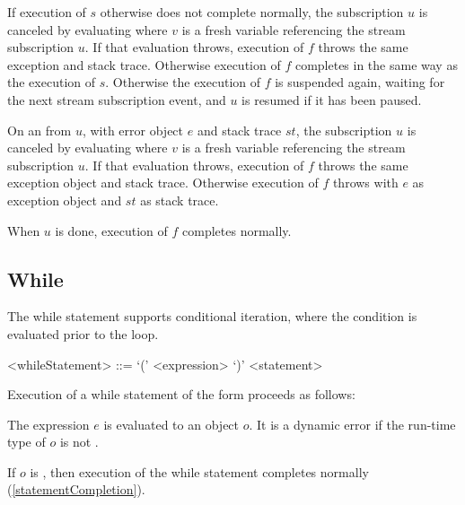 \documentclass[makeidx]{article}
\begin{document}
{\LMHash{}%
If execution of $s$ otherwise does not complete normally,
the subscription $u$ is canceled by evaluating 
where $v$ is a fresh variable referencing the stream subscription $u$.
If that evaluation throws,
execution of $f$ throws the same exception and stack trace.
Otherwise execution of $f$ completes in the same way as the execution of $s$.
Otherwise the execution of $f$ is suspended again, waiting for
the next stream subscription event,
and $u$ is resumed if it has been paused.

\LMHash{}%
On an  from $u$,
with error object $e$ and stack trace $st$,
the subscription $u$ is canceled by evaluating 
where $v$ is a fresh variable referencing the stream subscription $u$.
If that evaluation throws,
execution of $f$ throws the same exception object and stack trace.
Otherwise execution of $f$ throws
with $e$ as exception object and $st$ as stack trace.

\LMHash{}%
When $u$ is done, execution of $f$ completes normally.


\subsection{While}

\LMHash{}%
The while statement supports conditional iteration,
where the condition is evaluated prior to the loop.

\begin{grammar}
<whileStatement> ::= \WHILE{} `(' <expression> `)' <statement>
\end{grammar}

\LMHash{}%
Execution of a while statement of the form 
proceeds as follows:

\LMHash{}%
The expression $e$ is evaluated to an object $o$.
It is a dynamic error if the run-time type of $o$ is not .

\LMHash{}%
If $o$ is \FALSE, then execution of the while statement completes normally
(\ref{statementCompletion}).

}
\end{document}
